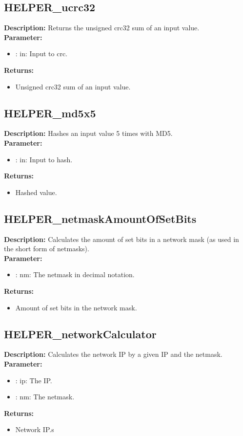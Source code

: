 \subsection{HELPER\_ucrc32}
\textbf{Description:} Returns the unsigned crc32 sum of an input value.\\
\textbf{Parameter:}
\begin{itemize}
\item : in: Input to crc.
\end{itemize}
\textbf{Returns:}
\begin{itemize}
\item Unsigned crc32 sum of an input value.
\end{itemize}

\subsection{HELPER\_md5x5}
\textbf{Description:} Hashes an input value 5 times with MD5.\\
\textbf{Parameter:}
\begin{itemize}
\item : in: Input to hash.
\end{itemize}
\textbf{Returns:}
\begin{itemize}
\item Hashed value.
\end{itemize}

\subsection{HELPER\_netmaskAmountOfSetBits}
\textbf{Description:} Calculates the amount of set bits in a network mask (as used in the short form of netmasks).\\
\textbf{Parameter:}
\begin{itemize}
\item : nm: The netmask in decimal notation.
\end{itemize}
\textbf{Returns:}
\begin{itemize}
\item Amount of set bits in the network mask.
\end{itemize}

\subsection{HELPER\_networkCalculator}
\textbf{Description:} Calculates the network IP by a given IP and the netmask.\\
\textbf{Parameter:}
\begin{itemize}
\item : ip: The IP.
\item : nm: The netmask.
\end{itemize}
\textbf{Returns:}
\begin{itemize}
\item Network IP.s
\end{itemize}

